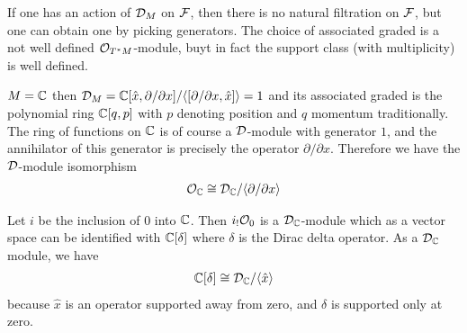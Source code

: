 \documentclass[12pt]{article}
\begin{document}
If one has an action of ${\mathcal{D}}_M$ on ${\mathcal{F}}$, then there is no natural filtration on ${\mathcal{F}}$, but one can obtain one by picking generators. The choice of associated graded is a not well defined ${\mathcal{O}}_{T^*M}$-module, buyt in fact the support class (with multiplicity) is well defined.

\begin{example}
    $M = \mathbb{C}$ then ${\mathcal{D}}_M = \mathbb{C}[\hat{x},\partial/\partial x]/\langle{[\partial/\partial x,\hat{x}]}\rangle = 1$ and its associated graded is the polynomial ring $\mathbb{C}[q,p]$ with $p$ denoting position and $q$ momentum traditionally. The ring of functions on $\mathbb{C}$ is of course a ${\mathcal{D}}$-module with generator $1$, and the annihilator of this generator is precisely the operator $\partial/\partial x$. Therefore we have the ${\mathcal{D}}$-module isomorphism \begin{align*}
        {\mathcal{O}}_{\mathbb{C}} \cong {\mathcal{D}}_{\mathbb{C}} / \langle{\partial/\partial x}\rangle
    \end{align*}
\end{example}

\begin{example}
    Let $i$ be the inclusion of $0$ into $\mathbb{C}$. Then $i_!{\mathcal{O}}_0$ is a ${\mathcal{D}}_{\mathbb{C}}$-module which as a vector space can be identified with $\mathbb{C}[\delta]$ where $\delta$ is the Dirac delta operator. As a ${\mathcal{D}}_{\mathbb{C}}$ module, we have \begin{align*}
        \mathbb{C}[\delta] \cong {\mathcal{D}}_{\mathbb{C}}/\langle{\hat{x}}\rangle
    \end{align*} because $\hat{x}$ is an operator supported away from zero, and $\delta$ is supported only at zero.
\end{example}
\end{document}
